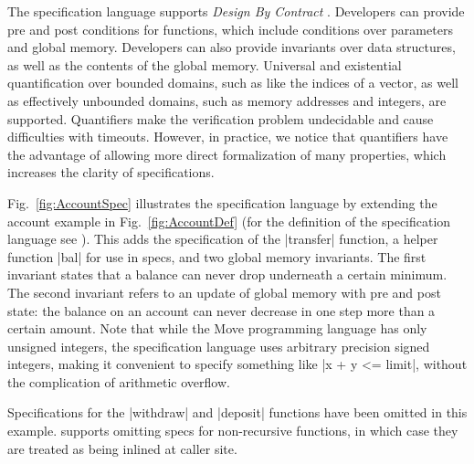 \noindent The specification language supports {\em Design By Contract}
\cite{DESIGN_BY_CONTRACT}. Developers can provide pre and post conditions for
functions, which include conditions over parameters and global
memory. Developers can also provide invariants over data structures, as well as
the contents of the global memory.  Universal and existential quantification
over bounded domains, such as like the indices of a vector, as well as
effectively unbounded domains, such as memory addresses and integers, are
supported.  Quantifiers make the verification problem undecidable and cause
difficulties with timeouts.  However, in practice, we notice that quantifiers
have the advantage of allowing more direct formalization of many properties,
which increases the clarity of specifications.

Fig.~\ref{fig:AccountSpec} illustrates the specification language by extending
the account example in Fig.~\ref{fig:AccountDef} (for the definition of the
specification language see \cite{MOVE_SPEC_LANG_DEF}). This adds the
specification of the |transfer| function, a helper function |bal| for use in
specs, and two global memory invariants. The first invariant states that a
balance can never drop underneath a certain minimum. The second invariant refers
to an update of global memory with pre and post state: the balance on an account
can never decrease in one step more than a certain amount.  Note that while the
Move programming language has only unsigned integers, the specification language
uses arbitrary precision signed integers, making it convenient to specify
something like |x + y <= limit|, without the complication of arithmetic
overflow.

Specifications for the |withdraw| and |deposit| functions have been omitted in
this example.  \MVP supports omitting specs for non-recursive functions, in
which case they are treated as being inlined at caller site.



